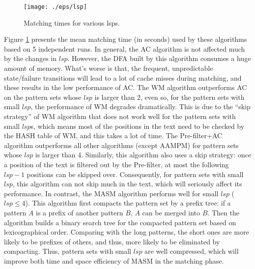 \documentclass{article}
\begin{document}



\begin{figure}[htbp]
  \centering
  \texttt{[image: ./eps/lsp]}
  \caption{Matching times for various lsps.}
  \label{fig:lsp}
\end{figure}

Figure \ref{fig:lsp} presents the mean matching time (in seconds) used
by these algorithms based on 5 independent runs.  In general, the
\textsf{AC} algorithm is not affected much by the changes in $lsp$.
However, the DFA built by this algorithm consumes a huge amount of
memory. What's worse is that, the frequent, unpredictable
state/failure transitions will lead to a lot of cache misses during
matching, and these results in the low performance of \textsf{AC}. The
\textsf{WM} algorithm outperforms \textsf{AC} on the pattern sets
whose $lsp$ is larger than 2, even so, for the pattern sets with small
$lsp$, the performance of \textsf{WM} degrades dramatically. This is
due to the ``skip strategy'' of \textsf{WM} algorithm that does not
work well for the pattern sets with small $lsp$s, which means most of
the positions in the text need to be checked by the HASH table of
\textsf{WM}, and this takes a lot of time. The \textsf{Pre-filter+AC}
algorithm outperforms all other algorithms (except \textsf{AAMPM}) for
pattern sets whose $lsp$ is larger than 4. Similarly, this algorithm
also uses a skip strategy: once a position of the text is filtered out
by the Pre-filter, at most the following $lsp-1$ positions can be
skipped over. Consequently, for pattern sets with small $lsp$, this
algorithm can not skip much in the text, which will seriously affect
its performance. In contrast, the \textsf{MASM} algorithm performs
well for small $lsp$ ($lsp \leq 4$). This algorithm first compacts the
pattern set by a prefix tree: if a pattern $A$ is a prefix of another
pattern $B$, $A$ can be merged into $B$. Then the algorithm builds a
binary search tree for the compacted pattern set based on
lexicographical order. Comparing with the long patterns, the short
ones are more likely to be prefixes of others, and thus, more likely
to be eliminated by compacting. Thus, pattern sets with small $lsp$
are well compressed, which will improve both time and space efficiency
of \textsf{MASM} in the matching phase.
\end{document}
